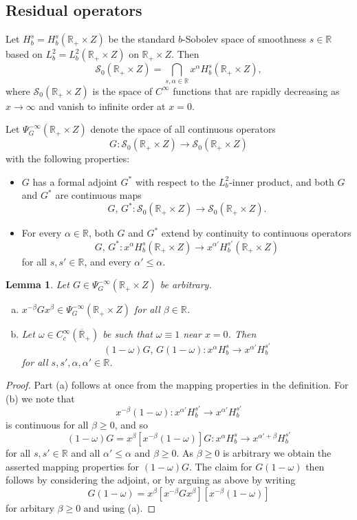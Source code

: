 \documentclass[reqno]{amsart}
\numberwithin{equation}{section}
\newtheorem{lemma}[equation]{Lemma}
\theoremstyle{definition}
\def\R{\mathbb R}
\def\S{\mathscr S}
\begin{document}
\subsection{Residual operators}\label{sec-ResidualModel}
 
Let $H^s_b = H^{s}_b(\R_+\times Z)$ be the standard $b$-Sobolev space of smoothness $s \in \R$ based on $L^2_b = L^2_b(\R_+\times Z)$ on $\R_+\times Z$. Then
$$
\S_0(\R_+\times Z) = \bigcap_{s,\alpha \in \R} x^{\alpha}H^s_b(\R_+\times Z),
$$
where $\S_0(\R_+\times Z)$ is the space of $C^{\infty}$ functions that are rapidly decreasing as $x \to \infty$ and vanish to infinite order at $x=0$.

Let $\Psi_G^{-\infty}(\R_+\times Z)$ denote the space of all continuous operators
$$
G : \S_0(\R_+\times Z) \to \S_0(\R_+\times Z)
$$
with the following properties:
\begin{itemize}
\item $G$ has a formal adjoint $G^*$ with respect to the $L^2_b$-inner product, and both $G$ and $G^*$ are continuous maps
$$
G,\,G^* : \S_0(\R_+\times Z) \to \S_0(\R_+\times Z).
$$
\item For every $\alpha \in \R$, both $G$ and $G^*$ extend by continuity to continuous operators
$$
G,\,G^* : x^{\alpha}H^s_b(\R_+\times Z) \to x^{\alpha'}H_b^{s'}(\R_+\times Z)
$$
for all $s,s' \in \R$, and every $\alpha' \leq \alpha$.
\end{itemize}

\begin{lemma}\label{ResGreen}
Let $G \in \Psi^{-\infty}_G(\R_+\times Z)$ be arbitrary.
\begin{enumerate}[(a)]
\item $x^{-\beta}Gx^{\beta} \in \Psi^{-\infty}_G(\R_+\times Z)$ for all $\beta \in \R$.
\item Let $\omega \in C_c^{\infty}(\overline{\R}_+)$ be such that $\omega \equiv 1$ near $x = 0$. Then
$$
(1-\omega)G,\,G(1-\omega) : x^{\alpha}H^s_b \to x^{\alpha'}H^{s'}_b
$$
for all $s,s',\alpha,\alpha' \in \R$.
\end{enumerate}
\end{lemma}
\begin{proof}
Part (a) follows at once from the mapping properties in the definition. For (b) we note that
$$
x^{-\beta}(1-\omega) : x^{\alpha'}H^{s'}_b \to x^{\alpha'}H^{s'}_b
$$
is continuous for all $\beta \geq 0$, and so
$$
(1-\omega) G = x^{\beta} [x^{-\beta}(1-\omega)] G : x^{\alpha}H^s_b \to x^{\alpha'+\beta}H^{s'}_b
$$
for all $s,s' \in \R$ and all $\alpha' \leq \alpha$ and $\beta \geq 0$. As $\beta \geq 0$ is arbitrary we obtain the asserted mapping properties for $(1-\omega)G$. The claim for $G(1-\omega)$ then follows by considering the adjoint, or by arguing as above by writing
$$
G(1-\omega) = x^{\beta} [x^{-\beta} G x^{\beta}] [x^{-\beta}(1-\omega)]
$$
for arbitary $\beta \geq 0$ and using (a).
\end{proof}
\end{document}
